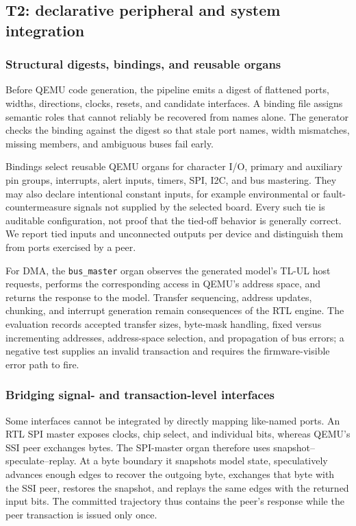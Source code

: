 \subsection{T2: declarative peripheral and system integration}

\subsubsection{Structural digests, bindings, and reusable organs}

Before QEMU code generation, the pipeline emits a digest of flattened ports,
widths, directions, clocks, resets, and candidate interfaces.  A binding file
assigns semantic roles that cannot reliably be recovered from names alone.  The
generator checks the binding against the digest so that stale port names, width
mismatches, missing members, and ambiguous buses fail early.

Bindings select reusable QEMU organs for character I/O, primary and auxiliary
pin groups, interrupts, alert inputs, timers, SPI, I2C, and bus mastering.  They
may also declare intentional constant inputs, for example environmental or
fault-countermeasure signals not supplied by the selected board.  Every such tie
is auditable configuration, not proof that the tied-off behavior is generally
correct.  We report tied inputs and unconnected outputs per device and distinguish
them from ports exercised by a peer.

For DMA, the \texttt{bus\_master} organ observes the generated model's TL-UL host
requests, performs the corresponding access in QEMU's address space, and returns
the response to the model.  Transfer sequencing, address updates, chunking, and
interrupt generation remain consequences of the RTL engine.  The evaluation
records accepted transfer sizes, byte-mask handling, fixed versus incrementing
addresses, address-space selection, and propagation of bus errors; a negative
test supplies an invalid transaction and requires the firmware-visible error
path to fire.

\subsubsection{Bridging signal- and transaction-level interfaces}

Some interfaces cannot be integrated by directly mapping like-named ports.  An
RTL SPI master exposes clocks, chip select, and individual bits, whereas QEMU's
SSI peer exchanges bytes.  The SPI-master organ therefore uses
snapshot--speculate--replay.  At a byte boundary it snapshots model state,
speculatively advances enough edges to recover the outgoing byte, exchanges that
byte with the SSI peer, restores the snapshot, and replays the same edges with
the returned input bits.  The committed trajectory thus contains the peer's
response while the peer transaction is issued only once.

